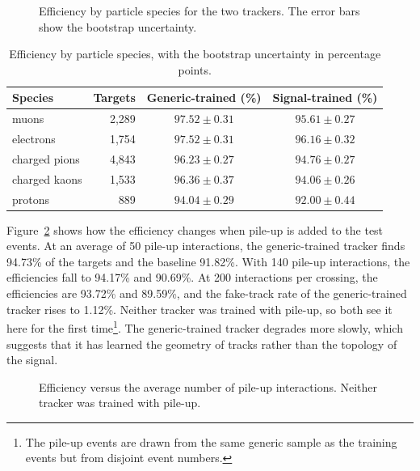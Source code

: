 \begin{figure}[tbp]
  \centering
  \caption{Efficiency by particle species for the two trackers. The error bars show the bootstrap uncertainty.}
  \label{fig:eff_species}
\end{figure}

\begin{table}[tbp]
  \caption{Efficiency by particle species, with the bootstrap uncertainty in percentage points.}
  \label{tab:species}
  \centering
  \begin{tabular}{lrcc}
    \hline\hline
    Species & Targets & Generic-trained (\%) & Signal-trained (\%) \\
    \hline
    muons & 2,289 & $97.52 \pm 0.31$ & $95.61 \pm 0.27$ \\
    electrons & 1,754 & $97.52 \pm 0.31$ & $96.16 \pm 0.32$ \\
    charged pions & 4,843 & $96.23 \pm 0.27$ & $94.76 \pm 0.27$ \\
    charged kaons & 1,533 & $96.36 \pm 0.37$ & $94.06 \pm 0.26$ \\
    protons & 889 & $94.04 \pm 0.29$ & $92.00 \pm 0.44$ \\
    \hline\hline
  \end{tabular}
\end{table}

Figure~\ref{fig:pileup} shows how the efficiency changes when pile-up is added to the test events.
At an average of 50 pile-up interactions, the generic-trained tracker finds 94.73\% of the targets
and the baseline 91.82\%. With 140 pile-up interactions, the efficiencies fall to 94.17\% and
90.69\%. At 200 interactions per crossing, the efficiencies are 93.72\% and 89.59\%, and the
fake-track rate of the generic-trained tracker rises to 1.12\%. Neither tracker was trained with
pile-up, so both see it here for the first time\footnote{The pile-up events are drawn from the same
generic sample as the training events but from disjoint event numbers.}. The generic-trained tracker
degrades more slowly, which suggests that it has learned the geometry of tracks rather than the
topology of the signal.

\begin{figure}[tbp]
  \centering
  \caption{Efficiency versus the average number of pile-up interactions. Neither tracker was trained with pile-up.}
  \label{fig:pileup}
\end{figure}

